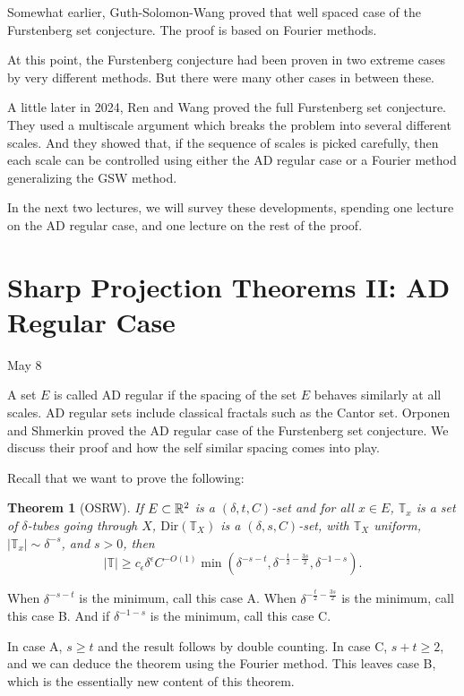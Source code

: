 \documentclass[12pt]{amsart}
\newtheorem{theorem}{Theorem}[section]
\begin{document}
Somewhat earlier,  Guth-Solomon-Wang proved that well spaced case of the Furstenberg set conjecture.    The proof is based on Fourier methods.

At this point,  the Furstenberg conjecture had been proven in two extreme cases by very different methods.   But there were many other cases in between these.  

A little later in 2024,  Ren and Wang proved the full Furstenberg set conjecture.   They used a multiscale argument which breaks the problem into several different scales.   And they showed that,  if the sequence of scales is picked carefully,  then each scale can be controlled using either the AD regular case or a Fourier method generalizing the GSW method.

In the next two lectures,  we will survey these developments,  spending one lecture on the AD regular case,  and one lecture on the rest of the proof.

\newpage

\section{Sharp Projection Theorems II: AD Regular Case}

May 8

 A set $E$ is called AD regular if the spacing of the set $E$ behaves similarly at all scales.  AD regular sets include classical fractals such as the Cantor set.   Orponen and Shmerkin proved the AD regular case of the Furstenberg set conjecture.   We discuss their proof and how the self similar spacing comes into play.

Recall that we want to prove the following:
\begin{theorem}[OSRW]
    If $E \subset \mathbb{R}^2$ is a $(\delta, t, C)$-set and for all $x \in E$, $\mathbb{T}_x$ is a set of $\delta$-tubes going through $X$, $\mathrm{Dir}(\mathbb{T}_X)$ is a $(\delta, s, C)$-set, with $\mathbb{T}_X$ uniform, $|\mathbb{T}_x| \sim \delta^{-s}$, and $s > 0$, then
    \[
        |\mathbb{T}| \geq c_\epsilon \delta^\epsilon C^{-O(1)} \min \left( \delta^{-s - t}, \delta^{-\frac{t}{2} - \frac{3s}{2}}, \delta^{-1 - s} \right).
    \]
\end{theorem}
When $\delta^{-s - t}$ is the minimum, call this case A. When $\delta^{-\frac{t}{2} - \frac{3s}{2}}$ is the minimum, call this case B. And if $\delta^{-1 - s}$ is the minimum, call this case C.

In case A, $s \geq t$ and the result follows by double counting. In case C, $s + t \geq 2$, and we can deduce the theorem using the Fourier method. This leaves case B, which is the essentially new content of this theorem.
\end{document}

